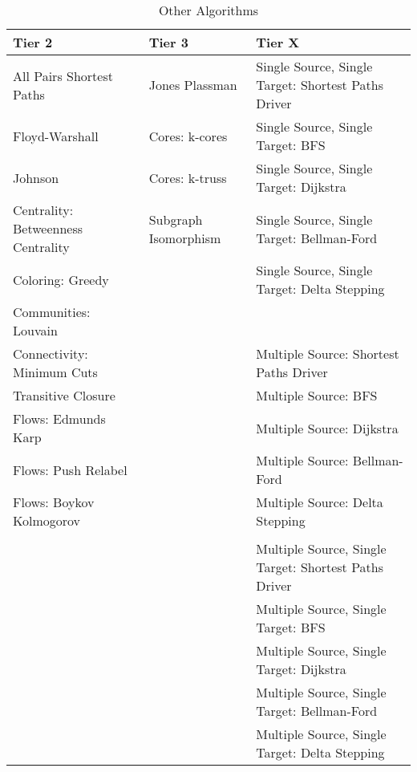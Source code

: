 \begin{table}[h!]
\begin{center}
{\begin{tabular}{l|l|l}
\hline
    \textbf{Tier 2} & \textbf{Tier 3} & \textbf{Tier X} \\
\hline
    All Pairs Shortest Paths & Jones Plassman & Single Source, Single Target: Shortest Paths Driver\\
    Floyd-Warshall & Cores: k-cores & Single Source, Single Target: BFS \\
    Johnson & Cores: k-truss & Single Source, Single Target: Dijkstra \\
    Centrality: Betweenness Centrality & Subgraph Isomorphism & Single Source, Single Target: Bellman-Ford \\
    Coloring: Greedy & & Single Source, Single Target: Delta Stepping \\
    Communities: Louvain & &  \\
    Connectivity: Minimum Cuts & & Multiple Source: Shortest Paths Driver \\
    Transitive Closure & & Multiple Source: BFS \\
    Flows: Edmunds Karp & & Multiple Source: Dijkstra \\
    Flows: Push Relabel & & Multiple Source: Bellman-Ford \\
    Flows: Boykov Kolmogorov & & Multiple Source: Delta Stepping \\
    & &  \\
    & & Multiple Source, Single Target: Shortest Paths Driver\\
    & & Multiple Source, Single Target: BFS \\
    & & Multiple Source, Single Target: Dijkstra \\
    & & Multiple Source, Single Target: Bellman-Ford \\
    & & Multiple Source, Single Target: Delta Stepping \\
\hline
\end{tabular}}
\caption{Other Algorithms}
\label{tab:other_algorithms}
\end{center}
\end{table}



